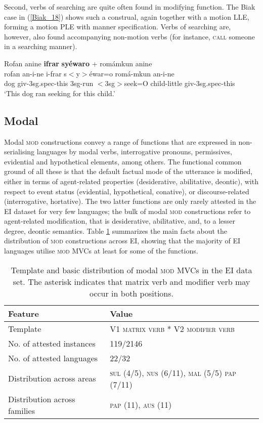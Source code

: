 Second, verbs of searching are quite often found in modifying function. The Biak case in (\ref{Biak_18}) shows such a construal, again together with a motion LLE, forming a motion PLE with manner specification. Verbs of searching are, however, also found accompanying non-motion verbs (for instance, \textsc{call} someone in a searching manner).

\ea \label{Biak_18}
\gll Rofan anine \textbf{ifrar} \textbf{syéwaro} + romámkun anine \\
rofan an-i-ne i-frar s$<$y$>$éwar=o romá-mkun an-i-ne \\
\glc dog \acs{giv}-3\acs{sg}.\acs{spec}-this 3\acs{sg}-run $<$3\acs{sg}$>$seek=O child-little \acs{giv}-3\acs{sg}.\acs{spec}-this \\
\glft `This dog ran seeking for this child.' \\ 
\z
\xe

\subsection{Modal}\label{sec:modal}

Modal \textsc{mod} constructions convey a range of functions that are expressed in non-serialising languages by modal verbs, interrogative pronouns, permissives, evidential and hypothetical elements, among others. The functional common ground of all these is that the default factual mode of the utterance is modified, either in terms of agent-related properties (desiderative, abilitative, deontic),  with respect to event status (evidential, hypothetical, conative), or discourse-related (interrogative, hortative). The two latter functions are only rarely attested in the EI dataset for very few languages; the bulk of modal \textsc{mod} constructions refer to agent-related modification, that is desiderative, abilitative, and, to a lesser degree, deontic semantics. Table \ref{table:modal} summarizes the main facts about the distribution of \textsc{mod} constructions across EI, showing that the majority of EI languages utilise \textsc{mod} MVCs at least for some of the functions.

\begin{table}


\begin{tabular}{ll}
\lsptoprule
Feature&Value\tabularnewline
\hline
Template&V1 \textsc{matrix verb} * V2 \textsc{modifier verb}\tabularnewline
No. of attested instances& 119/2146 \tabularnewline
No. of attested languages& 22/32 \tabularnewline
Distribution across areas& \textsc{sul} (4/5), \textsc{nus} (6/11), \textsc{mal} (5/5) \textsc{pap} (7/11) \tabularnewline
Distribution across families& \textsc{pap} (11), \textsc{aus} (11) \tabularnewline
\hline
\end{tabular}
\caption[Template and basic distribution of modal \textsc{mod} MVCs]{Template and basic distribution of modal \textsc{mod} MVCs in the EI data set. The asterisk indicates that matrix verb and modifier verb may occur in both positions.}
\label{table:modal}
\end{table}


